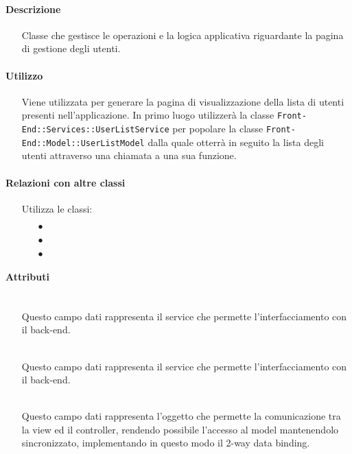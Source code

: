 \paragraph*{Descrizione}
\begin{itemize}
\item[] Classe che gestisce le operazioni e la logica applicativa riguardante la pagina di gestione degli utenti.
\end{itemize}

\paragraph*{Utilizzo}
\begin{itemize}
\item[] Viene utilizzata per generare la pagina di visualizzazione della lista di utenti presenti nell'applicazione. In primo luogo utilizzerà la classe \texttt{Front-End::Services::UserListService} per popolare la classe \texttt{Front-End::Model::UserListModel} dalla quale otterrà in seguito la lista degli utenti attraverso una chiamata a una sua funzione.
\end{itemize}

\paragraph*{Relazioni con altre classi}
\begin{itemize}


\item[] Utilizza le classi:
\begin{itemize}
\item[$\bullet$] 
\item[$\bullet$] 
\item[$\bullet$] 
\end{itemize}
\end{itemize}

\paragraph*{Attributi}
\begin{itemize}
\item[]  \\ Questo campo dati rappresenta il service che permette l'interfacciamento con il back-end.
\item[]  \\ Questo campo dati rappresenta il service che permette l'interfacciamento con il back-end.
\item[]  \\ Questo campo dati rappresenta l'oggetto che permette la comunicazione tra la view ed il controller, rendendo possibile l’accesso al model mantenendolo sincronizzato, implementando in questo modo il 2-way data binding.
\end{itemize}

